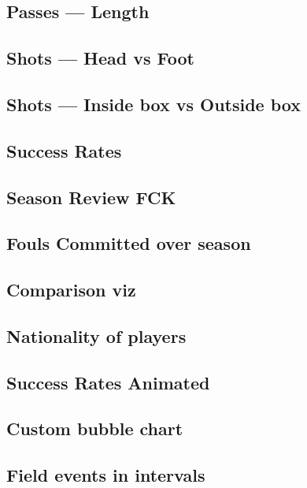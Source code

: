 \documentclass[a4paper,11pt]{article}
\begin{document}
\subsection{Passes --- Length}


\subsection{Shots --- Head vs Foot}


\subsection{Shots --- Inside box vs Outside box}


\subsection{Success Rates}


\subsection{Season Review FCK}


\subsection{Fouls Committed over season}


\subsection{Comparison viz}


\subsection{Nationality of players}


\subsection{Success Rates Animated}


\subsection{Custom bubble chart}


\subsection{Field events in intervals}

\end{document}
